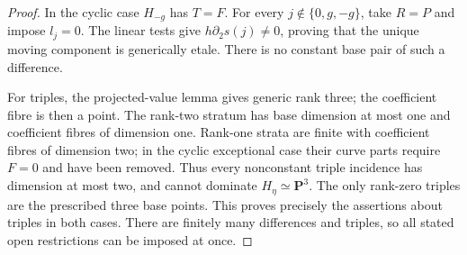 \begin{proof}
In the cyclic case $H_{-g}$ has $T=F$.
For every $j\notin\{0,g,-g\}$, take $R=P$ and impose $l_j=0$.
The linear tests give $h\partial_2s(j)\ne0$, proving that the
unique moving component is generically etale. There is no constant
base pair of such a difference.

For triples, the projected-value lemma gives generic rank three;
the coefficient fibre is then a point. The rank-two stratum has
base dimension at most one and coefficient fibres of dimension
one. Rank-one strata are finite with coefficient fibres of dimension
two; in the cyclic exceptional case their curve parts require
$F=0$ and have been removed. Thus every nonconstant triple
incidence has dimension at most two, and cannot dominate
$H_\eta\simeq\mathbf P^3$. The only rank-zero triples are the
prescribed three base points. This proves precisely the assertions
about triples in both cases. There are finitely many differences
and triples, so all stated open restrictions can be imposed at once.
\end{proof}

